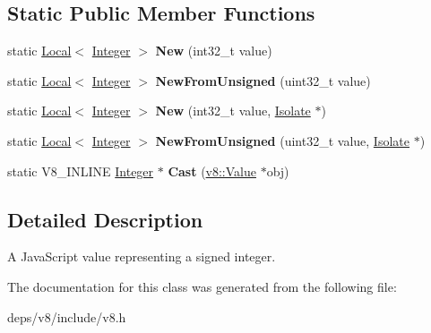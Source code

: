 \subsection*{Static Public Member Functions}
\begin{DoxyCompactItemize}
\item 
\hypertarget{classv8_1_1_integer_a1099725f8f38584a6123ecf0e7a62592}{}static \hyperlink{classv8_1_1_local}{Local}$<$ \hyperlink{classv8_1_1_integer}{Integer} $>$ {\bfseries New} (int32\+\_\+t value)\label{classv8_1_1_integer_a1099725f8f38584a6123ecf0e7a62592}

\item 
\hypertarget{classv8_1_1_integer_ac5fffb125b9469f3321a845838117887}{}static \hyperlink{classv8_1_1_local}{Local}$<$ \hyperlink{classv8_1_1_integer}{Integer} $>$ {\bfseries New\+From\+Unsigned} (uint32\+\_\+t value)\label{classv8_1_1_integer_ac5fffb125b9469f3321a845838117887}

\item 
\hypertarget{classv8_1_1_integer_ad311c6e5dfea52ba3f8468b346c474b6}{}static \hyperlink{classv8_1_1_local}{Local}$<$ \hyperlink{classv8_1_1_integer}{Integer} $>$ {\bfseries New} (int32\+\_\+t value, \hyperlink{classv8_1_1_isolate}{Isolate} $\ast$)\label{classv8_1_1_integer_ad311c6e5dfea52ba3f8468b346c474b6}

\item 
\hypertarget{classv8_1_1_integer_ae8184a2e974c841501e7e5aa1d59e6c4}{}static \hyperlink{classv8_1_1_local}{Local}$<$ \hyperlink{classv8_1_1_integer}{Integer} $>$ {\bfseries New\+From\+Unsigned} (uint32\+\_\+t value, \hyperlink{classv8_1_1_isolate}{Isolate} $\ast$)\label{classv8_1_1_integer_ae8184a2e974c841501e7e5aa1d59e6c4}

\item 
\hypertarget{classv8_1_1_integer_a886f73d3d8bb91f8235f66d8dccec12a}{}static V8\+\_\+\+I\+N\+L\+I\+N\+E \hyperlink{classv8_1_1_integer}{Integer} $\ast$ {\bfseries Cast} (\hyperlink{classv8_1_1_value}{v8\+::\+Value} $\ast$obj)\label{classv8_1_1_integer_a886f73d3d8bb91f8235f66d8dccec12a}

\end{DoxyCompactItemize}


\subsection{Detailed Description}
A Java\+Script value representing a signed integer. 

The documentation for this class was generated from the following file\+:\begin{DoxyCompactItemize}
\item 
deps/v8/include/v8.\+h\end{DoxyCompactItemize}
